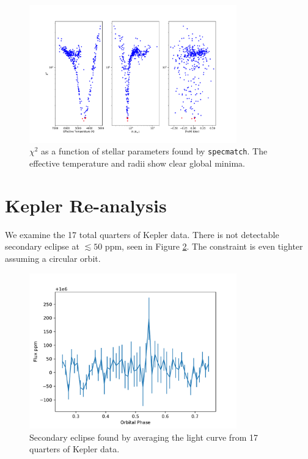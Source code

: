 \documentclass[twocolumn]{aastex61}
\begin{document}
\begin{figure}[!hbtp]
\begin{centering}
\includegraphics[width=0.8\textwidth]{images/subaru/spec_chi_min.pdf}
\caption{$\chi^2$ as a function of stellar parameters found by \texttt{specmatch}.
The effective temperature and radii show clear global minima.}\label{fig:specMatch}
\end{centering}
\end{figure}


\clearpage

\section{Kepler Re-analysis}
We examine the 17 total quarters of Kepler data.
There is not detectable secondary eclipse at $\lesssim 50$ ppm, seen in Figure \ref{fig:secEclipse}. 
The constraint is even tighter assuming a circular orbit.

\begin{figure}[!hbtp]
\begin{centering}
\includegraphics[width=0.8\textwidth]{images/kepler/secondary_eclipse.pdf}
\caption{Secondary eclipse found by averaging the light curve from 17 quarters of Kepler data.}\label{fig:secEclipse}
\end{centering}
\end{figure}
\end{document}
